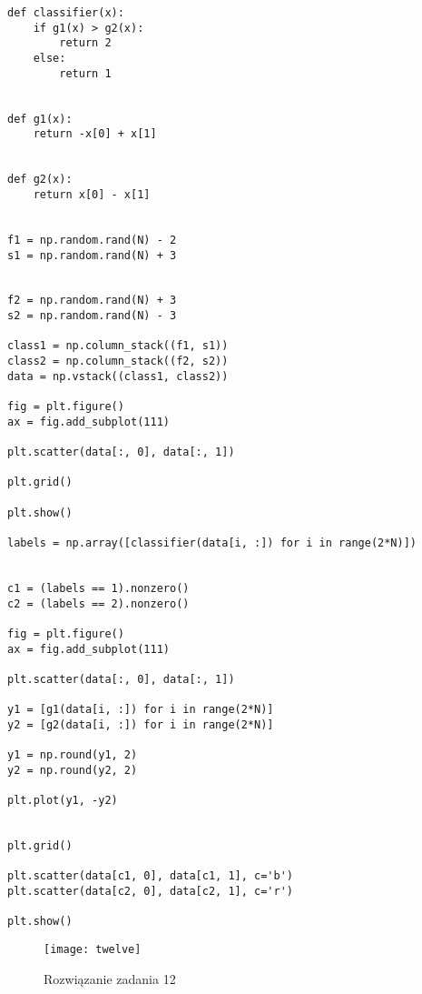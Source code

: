 \documentclass[12pt,a4paper]{article}
\begin{document}
\begin{itemize}
\begin{lstlisting}
def classifier(x):
    if g1(x) > g2(x):
        return 2
    else:
        return 1


def g1(x):
    return -x[0] + x[1]


def g2(x):
    return x[0] - x[1]


f1 = np.random.rand(N) - 2
s1 = np.random.rand(N) + 3


f2 = np.random.rand(N) + 3
s2 = np.random.rand(N) - 3

class1 = np.column_stack((f1, s1))
class2 = np.column_stack((f2, s2))
data = np.vstack((class1, class2))

fig = plt.figure()
ax = fig.add_subplot(111)

plt.scatter(data[:, 0], data[:, 1])

plt.grid()

plt.show()

labels = np.array([classifier(data[i, :]) for i in range(2*N)])


c1 = (labels == 1).nonzero()
c2 = (labels == 2).nonzero()

fig = plt.figure()
ax = fig.add_subplot(111)

plt.scatter(data[:, 0], data[:, 1])

y1 = [g1(data[i, :]) for i in range(2*N)]
y2 = [g2(data[i, :]) for i in range(2*N)]

y1 = np.round(y1, 2)
y2 = np.round(y2, 2)

plt.plot(y1, -y2)


plt.grid()

plt.scatter(data[c1, 0], data[c1, 1], c='b')
plt.scatter(data[c2, 0], data[c2, 1], c='r')

plt.show()
	\end{lstlisting}
		\begin{figure}[h]
                        \texttt{[image: twelve]}
                        \centering
			\caption{Rozwiązanie zadania 12}
			\label{fig:fig12}
                \end{figure}
                \clearpage

        	\end{itemize}
	
\end{document}
